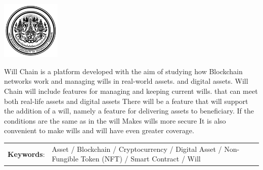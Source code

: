 \documentclass[12pt,oneside,openright,a4paper]{cpe-thai-project}
\begin{document}
\pdfstringdefDisableCommands{%
\let\MakeUppercase\relax
}

\begin{center}
  \includegraphics[width=2.8cm]{logo02.jpg}
\end{center}
\vspace*{-1cm}

\maketitlepage
\makesignaturepage 

\abstract

Will Chain is a platform developed with the aim of studying how Blockchain networks work and managing wills in real-world assets. and digital assets. Will Chain will include features for managing and keeping current wills. that can meet both real-life assets and digital assets There will be a feature that will support the addition of a will, namely a feature for delivering assets to beneficiary. If the conditions are the same as in the will Makes wills more secure It is also convenient to make wills and will have even greater coverage.

\begin{flushleft}
\begin{tabular*}{\textwidth}{@{}lp{}}
\textbf{Keywords}: & Asset / Blockchain / Cryptocurrency / Digital Asset / Non-Fungible Token (NFT) /  Smart Contract / Will 
\end{tabular*}
\end{flushleft}
\endabstract

\newcommand\tab[1][1cm]{\hspace*{#1}}
\thaiabstract
\end{document}
